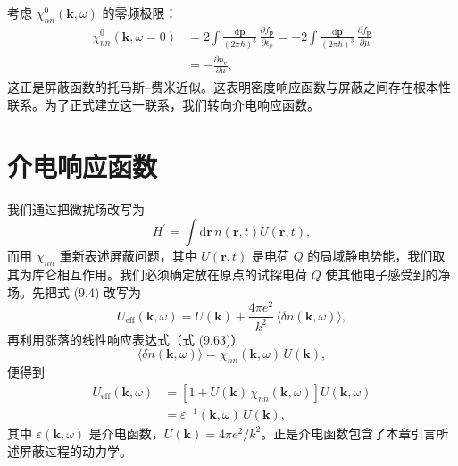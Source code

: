 考虑 $\chi_{nn}^{0}(\mathbf{k},\omega)$ 的零频极限：
\begin{equation*}
\begin{aligned}
\chi_{nn}^{0}(\mathbf{k},\omega=0)&=2\int\frac{\mathrm{d}\mathbf{p}}{(2\pi\hbar)^3}\,\frac{\partial f_{\mathbf{p}}}{\partial\epsilon_p}=-2\int\frac{\mathrm{d}\mathbf{p}}{(2\pi\hbar)^3}\,\frac{\partial f_{\mathbf{p}}}{\partial\mu}\\
&=-\frac{\partial n_{\mathrm{e}}}{\partial\mu},
\end{aligned}\tag{9.71}
\end{equation*}
这正是屏蔽函数的托马斯–费米近似。这表明密度响应函数与屏蔽之间存在根本性联系。为了正式建立这一联系，我们转向介电响应函数。

\section{介电响应函数}

我们通过把微扰场改写为
\begin{equation*}
H^{\prime}=\int\mathrm{d}\mathbf{r}\,n(\mathbf{r},t)U(\mathbf{r},t),\tag{9.72}
\end{equation*}
而用 $\chi_{nn}$ 重新表述屏蔽问题，其中 $U(\mathbf{r},t)$ 是电荷 $Q$ 的局域静电势能，我们取其为库仑相互作用。我们必须确定放在原点的试探电荷 $Q$ 使其他电子感受到的净场。先把式 (9.4) 改写为
\begin{equation*}
U_{\mathrm{eff}}(\mathbf{k},\omega)=U(\mathbf{k})+\frac{4\pi e^2}{k^2}\,\langle\delta n(\mathbf{k},\omega)\rangle,\tag{9.73}
\end{equation*}
再利用涨落的线性响应表达式（式 (9.63)）
\begin{equation*}
\langle\delta n(\mathbf{k},\omega)\rangle=\chi_{nn}(\mathbf{k},\omega)\,U(\mathbf{k}),\tag{9.74}
\end{equation*}
便得到
\begin{equation*}
\begin{aligned}
U_{\mathrm{eff}}(\mathbf{k},\omega)&=\left[1+U(\mathbf{k})\,\chi_{nn}(\mathbf{k},\omega)\right]U(\mathbf{k},\omega)\\
&=\varepsilon^{-1}(\mathbf{k},\omega)\,U(\mathbf{k}),
\end{aligned}\tag{9.75}
\end{equation*}
其中 $\varepsilon(\mathbf{k},\omega)$ 是介电函数，$U(\mathbf{k})=4\pi e^2/k^2$。正是介电函数包含了本章引言所述屏蔽过程的动力学。

